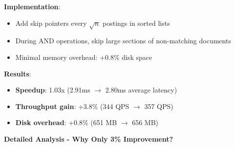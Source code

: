 \documentclass[12pt,a4paper]{article}
\begin{document}
\textbf{Implementation}:
\begin{itemize}
    \item Add skip pointers every $\sqrt{n}$ postings in sorted lists
    \item During AND operations, skip large sections of non-matching documents
    \item Minimal memory overhead: +0.8\% disk space
\end{itemize}

\textbf{Results}:
\begin{itemize}
    \item \textbf{Speedup}: 1.03x (2.91ms $\rightarrow$ 2.80ms average latency)
    \item \textbf{Throughput gain}: +3.8\% (344 QPS $\rightarrow$ 357 QPS)
    \item \textbf{Disk overhead}: +0.8\% (651 MB $\rightarrow$ 656 MB)
\end{itemize}

\textbf{Detailed Analysis - Why Only 3\% Improvement?}
\end{document}
